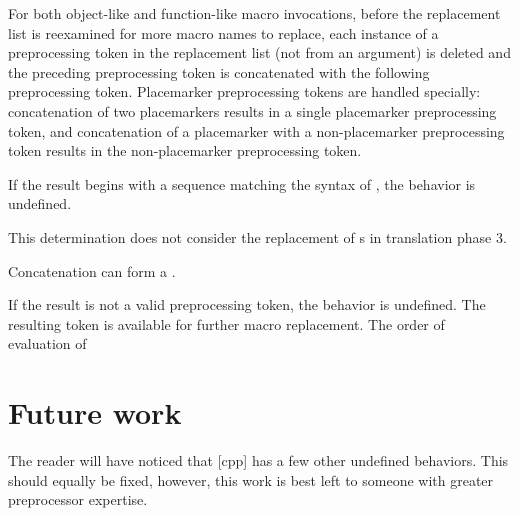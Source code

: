 \documentclass{wg21}
\begin{document}
For both object-like and function-like macro invocations, before the
replacement list is reexamined for more macro names to replace,
each instance of a
\tcode{\#\#}
preprocessing token in the replacement list
(not from an argument) is deleted and the
preceding preprocessing token is concatenated
with the following preprocessing token.
Placemarker preprocessing tokens are handled specially: concatenation
of two placemarkers results in a single placemarker preprocessing token, and
concatenation of a placemarker with a non-placemarker preprocessing token results
in the non-placemarker preprocessing token.
\begin{removedblock}
 If the result begins with a sequence matching the syntax of ,
the behavior is undefined.

\begin{note}
    This determination does not consider the replacement of
    s in translation phase 3.
\end{note}
\end{removedblock}
\begin{addedblock}
\begin{note}
Concatenation can form a .
\end{note}
\end{addedblock}

If the result is not a valid preprocessing token,
the behavior is undefined.
The resulting token is available for further macro replacement.
The order of evaluation of
\tcode{\#\#}

\section{Future work}

The reader will have noticed that [cpp] has a few other undefined behaviors.
This should equally be fixed, however, this work is best left to someone with greater preprocessor expertise.
\end{document}
